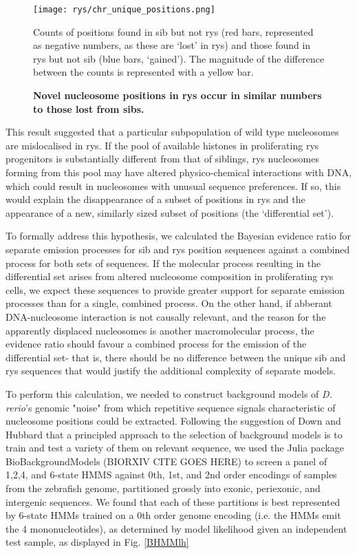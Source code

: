 \begin{figure}[!h]
\texttt{[image: rys/chr\_unique\_positions.png]}
\caption{{\bf Novel nucleosome positions in rys occur in similar numbers to those lost from sibs.}}
Counts of positions found in sib but not rys (red bars, represented as negative numbers, as these are `lost' in rys) and those found in rys but not sib (blue bars, `gained'). The magnitude of the difference between the counts is represented with a yellow bar.
\label{diffposdist}
\end{figure}

This result suggested that a particular subpopulation of wild type nucleosomes are mislocalised in rys. If the pool of available histones in proliferating rys progenitors is substantially different from that of siblings, rys nucleosomes forming from this pool may have altered physico-chemical interactions with DNA, which could result in nucleosomes with unusual sequence preferences. If so, this would explain the disappearance of a subset of positions in rys and the appearance of a new, similarly sized subset of positions (the `differential set').

To formally address this hypothesis, we calculated the Bayesian evidence ratio for separate emission processes for sib and rys position sequences against a combined process for both sets of sequences. If the molecular process resulting in the differential set arises from altered nucleosome composition in proliferating rys cells, we expect these sequences to provide greater support for separate emission processes than for a single, combined process. On the other hand, if abberant DNA-nucleosome interaction is not causally relevant, and the reason for the apparently displaced nucleosomes is another macromolecular process, the evidence ratio should favour a combined process for the emission of the differential set- that is, there should be no difference between the unique sib and rys sequences that would justify the additional complexity of separate models.

To perform this calculation, we needed to construct background models of \textit{D. rerio}'s genomic "noise" from which repetitive sequence signals characteristic of nucleosome positions could be extracted. Following the suggestion of Down and Hubbard \cite{Down2005} that a principled approach to the selection of background models is to train and test a variety of them on relevant sequence, we used the Julia package BioBackgroundModels (BIORXIV CITE GOES HERE) to screen a panel of 1,2,4, and 6-state HMMS against  0th, 1st, and 2nd order encodings of samples from the zebrafish genome, partitioned grossly into exonic, periexonic, and intergenic sequences. We found that each of these partitions is best represented by 6-state HMMs trained on a 0th order genome encoding (i.e. the HMMs emit the 4 mononucleotides), as determined by model likelihood given an independent test sample, as displayed in Fig. \ref{BHMMlh}





